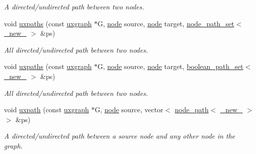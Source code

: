 \begin{DoxyCompactItemize}
\begin{DoxyCompactList}\small\item\em A directed/undirected path between two nodes. \end{DoxyCompactList}\item 
void \hyperlink{namespacelgraph_1_1traversal_a16078c9a8e08e18e017590e6e13860ec}{uxpaths} (const \hyperlink{classlgraph_1_1utils_1_1uxgraph}{uxgraph} $\ast$G, \hyperlink{namespacelgraph_1_1utils_ab9c6b34241f0b68372c55f34c460e863}{node} source, \hyperlink{namespacelgraph_1_1utils_ab9c6b34241f0b68372c55f34c460e863}{node} target, \hyperlink{namespacelgraph_1_1utils_a723c115f9865edfab11a90377b9abef4}{node\+\_\+path\+\_\+set}$<$ \hyperlink{namespacelgraph_1_1utils_a2c84bfde888c42ab3ad6b2cb8a364240}{\+\_\+new\+\_\+} $>$ \&ps)
\begin{DoxyCompactList}\small\item\em All directed/undirected path between two nodes. \end{DoxyCompactList}\item 
void \hyperlink{namespacelgraph_1_1traversal_a7421bd43fdc27c34609cb21b6ca99f84}{uxpaths} (const \hyperlink{classlgraph_1_1utils_1_1uxgraph}{uxgraph} $\ast$G, \hyperlink{namespacelgraph_1_1utils_ab9c6b34241f0b68372c55f34c460e863}{node} source, \hyperlink{namespacelgraph_1_1utils_ab9c6b34241f0b68372c55f34c460e863}{node} target, \hyperlink{namespacelgraph_1_1utils_aaf50131e15d771a45620336d6e7a77f8}{boolean\+\_\+path\+\_\+set}$<$ \hyperlink{namespacelgraph_1_1utils_a2c84bfde888c42ab3ad6b2cb8a364240}{\+\_\+new\+\_\+} $>$ \&ps)
\begin{DoxyCompactList}\small\item\em All directed/undirected path between two nodes. \end{DoxyCompactList}\item 
void \hyperlink{namespacelgraph_1_1traversal_a1487fb3fc594632e35001a895b31bb8a}{uxpath} (const \hyperlink{classlgraph_1_1utils_1_1uxgraph}{uxgraph} $\ast$G, \hyperlink{namespacelgraph_1_1utils_ab9c6b34241f0b68372c55f34c460e863}{node} source, vector$<$ \hyperlink{classlgraph_1_1utils_1_1node__path}{node\+\_\+path}$<$ \hyperlink{namespacelgraph_1_1utils_a2c84bfde888c42ab3ad6b2cb8a364240}{\+\_\+new\+\_\+} $>$ $>$ \&ps)
\begin{DoxyCompactList}\small\item\em A directed/undirected path between a source node and any other node in the graph. \end{DoxyCompactList}\item 

\end{DoxyCompactItemize}
